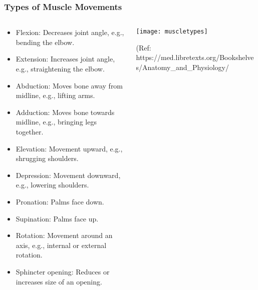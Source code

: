 \begin{frame}[fragile]\frametitle{Types of Muscle Movements}
\begin{columns}
    \begin{column}[T]{0.7\linewidth}
      \begin{itemize}
		\item Flexion: Decreases joint angle, e.g., bending the elbow.
		\item Extension: Increases joint angle, e.g., straightening the elbow.
		\item Abduction: Moves bone away from midline, e.g., lifting arms.
		\item Adduction: Moves bone towards midline, e.g., bringing legs together.
		\item Elevation: Movement upward, e.g., shrugging shoulders.
		\item Depression: Movement downward, e.g., lowering shoulders.
		\item Pronation: Palms face down.
		\item Supination: Palms face up.
		\item Rotation: Movement around an axis, e.g., internal or external rotation.
		\item Sphincter opening: Reduces or increases size of an opening.
	  \end{itemize}
    \end{column}
    \begin{column}[T]{0.3\linewidth}
		\begin{center}
		\texttt{[image: muscletypes]}
				
		{\tiny (Ref: https://med.libretexts.org/Bookshelves/Anatomy\_and\_Physiology/}		
		\end{center}	
    \end{column}
  \end{columns}
\end{frame}

